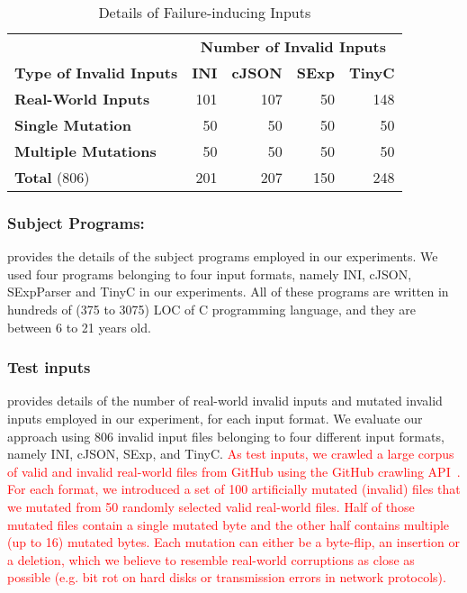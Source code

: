 \documentclass[sigconf,review,anonymous]{acmart}
\newcounter{todocounter}
\newcommand{\todo}[1]{\marginpar{$|$}\textcolor{red}{\stepcounter{todocounter}\footnote[\thetodocounter]{\textcolor{red}{\textbf{TODO }}\textit{#1}}}}
\newcommand{\recheck}[1]{\textcolor{red}{#1}}
\renewcommand{\todo}[1]{}
\begin{document}
\begin{table}[!tbp]\centering
\caption{Details of Failure-inducing Inputs}
\begin{tabular}{|l | r | r | r | r |}
\hline
&  \multicolumn{4}{c|}{\textbf{Number of Invalid Inputs}}  \\
\textbf{Type of Invalid Inputs} & \textbf{INI} & \textbf{cJSON} & \textbf{SExp} & \textbf{TinyC} \\
\hline
\textbf{Real-World Inputs} & 101 & 107 & 50 & 148 \\
\textbf{Single Mutation} & 50 & 50 & 50 & 50 \\
\textbf{Multiple Mutations} & 50 & 50 & 50 & 50 \\
\hline
\textbf{Total } (806) & 201 & 207 & 150 & 248 \\
\hline
\end{tabular}
\label{tab:input-details}
\end{table}

\subsubsection*{\bf Subject Programs:}  provides the details of the subject programs employed in our experiments. We used four programs belonging to four input formats, namely INI, cJSON, SExpParser and TinyC in our experiments. All of these programs are written in hundreds of (375 to 3075) LOC of C programming language, and they are between 6 to 21 years old.

\subsubsection*{\bf Test inputs}\todo{refactor this}
 provides details of the number of
real-world invalid inputs and mutated invalid inputs employed in our experiment, for each input format. We evaluate our approach using 806 invalid input files belonging to four different input formats, namely INI, cJSON, SExp, and TinyC. 
\recheck{
As test inputs, we crawled a large corpus of valid and invalid real-world files from GitHub using the GitHub crawling API~\cite{githubapi}.
For each format, we introduced a set of 100 artificially mutated (invalid) files that we mutated from 50 randomly selected valid real-world files.
Half of those mutated files contain a single mutated byte and the other half contains multiple (up to 16) mutated bytes.
Each mutation can either be a byte-flip, an insertion or a deletion, which we believe to resemble real-world corruptions as close as possible (e.g. bit rot on hard disks or transmission errors in network protocols).}
\end{document}
